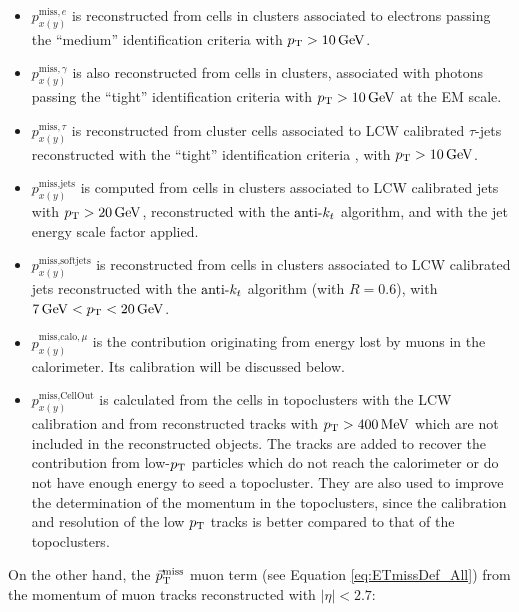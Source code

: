 \begin{itemize}

\item{$p_{x(y)}^{\text{miss},e}$ }is reconstructed from cells in clusters associated to electrons passing the ``medium'' identification criteria with $\pt>\unit[10]{GeV}$.

\item{$p_{x(y)}^{\text{miss},\gamma}$ }is also reconstructed from cells in clusters, associated with photons passing the ``tight'' identification criteria \cite{ATLAS:2012ana} with $\pt>\unit[10]{GeV}$ at the EM scale.

\item{$p_{x(y)}^{\text{miss},\tau}$ }is reconstructed from cluster cells associated to LCW calibrated $\tau$-jets reconstructed with the ``tight'' identification criteria \cite{TheATLAScollaboration:2013wha}, with $\pt>\unit[10]{GeV}$.

\item{$p_{x(y)}^{\text{miss,jets}}$ }is computed from cells in clusters associated to LCW calibrated jets with  $\pt>\unit[20]{GeV}$, reconstructed with the $\hbox{anti-${k_t}$}$ algorithm, and with the jet energy scale factor applied.

\item{$p_{x(y)}^{\text{miss,softjets}}$} is reconstructed from cells in clusters associated to LCW calibrated jets reconstructed with the $\hbox{anti-${k_t}$}$ algorithm (with $R=0.6$), with $\unit[7]{GeV}<\pt<\unit[20]{GeV}$.

\item{$p_{x(y)}^{\text{miss,calo},\mu}$} is the contribution originating from energy lost by muons in the calorimeter.
Its calibration will be discussed below.

\item{$p_{x(y)}^{\text{miss,CellOut}}$} is calculated from the cells in topoclusters with the LCW calibration and from reconstructed tracks with $\pt>\unit[400]{MeV}$  which are not included in the reconstructed objects.
 The tracks are added to recover the contribution from low-$p_{\mathrm{T}}$ particles which do not reach the calorimeter or do not have enough energy to seed a topocluster.
They are also used to improve the determination of the momentum in the topoclusters, since the calibration and resolution of the low $p_{\mathrm{T}}$ tracks is better compared to that of the topoclusters.

\end{itemize}

On the other hand, the $\vec{p}_{\mathrm{T}}^{\mathrm{miss}}$ muon term (see Equation \ref{eq:ETmissDef_All}) from the momentum of muon tracks reconstructed with $|\eta|<2.7$:

